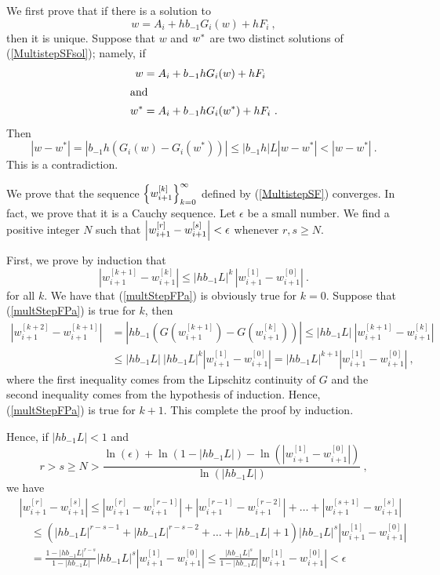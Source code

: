 \begin{rmkList}
\begin{enumerate}
We first prove that if there is a solution to
\begin{equation} \label{MultistepSFsol}
w = A_i + h b_{-1} G_i(w) + h F_i \ ,
\end{equation}
then it is unique.  Suppose that $w$ and $\displaystyle w^\ast$ are two distinct
solutions of (\ref{MultistepSFsol}); namely, if
\begin{align*}
w &= A_i + b_{-1} h G_i(w) + h F_i\\
\intertext{and}
w^\ast &= A_i + b_{-1} h G_i(w^\ast) + h F_i \ .
\end{align*}
Then
\[
|w - w^\ast| = |b_{-1} h (G_i(w) - G_i(w^\ast))|
\leq |b_{-1} h| L |w -w^\ast| < |w - w^\ast| \ .
\]
This is a contradiction.

We prove that the sequence
$\displaystyle \left\{ w_{i+1}^{[k]} \right\}_{k=0}^\infty$
defined by (\ref{MultistepSF}) converges.  In fact, we prove that it
is a Cauchy sequence.  Let $\epsilon$ be a small number.  We find a
positive integer $N$  such that
$\displaystyle \left|w_{i+1}^{[r]} - w_{i+1}^{[s]} \right|< \epsilon$ whenever 
$r,s \geq N$.

First, we prove by induction that
\begin{equation} \label{multStepFPa}
\left| w_{i+1}^{[k+1]} - w_{i+1}^{[k]} \right|
\leq |h b_{-1} L|^k\, \left|w_{i+1}^{[1]} - w_{i+1}^{[0]} \right| \ .
\end{equation}
for all $k$.  We have that (\ref{multStepFPa}) is obviously true for
$k=0$.  Suppose that (\ref{multStepFPa}) is true for $k$, then
\begin{align*}
\left|w_{i+1}^{[k+2]} - w_{i+1}^{[k+1]}\right| &=
\left|h b_{-1} \left( G\left(w_{i+1}^{[k+1]}\right)
- G\left(w_{i+1}^{[k]} \right) \right)\right|
\leq |h b_{-1} L|\ \left| w_{i+1}^{[k+1]} - w_{i+1}^{[k]} \right| \\
&\leq |h b_{-1} L|\ |h b_{-1} L|^k \left|w_{i+1}^{[1]} - w_{i+1}^{[0]} \right|
= |h b_{-1} L|^{k+1} \left| w_{i+1}^{[1]} -w_{i+1}^{[0]} \right| \ ,
\end{align*}
where the first inequality comes from the Lipschitz continuity of $G$
and the second inequality comes from the hypothesis of induction.  Hence,
(\ref{multStepFPa}) is true for $k+1$.  This complete the proof by
induction.

Hence, if $|h b_{-1} L|<1$ and
\[
r > s \geq N >
\frac{\ln(\epsilon) + \ln(1 - |h b_{-1} L|) - 
\ln\left(\left|w_{i+1}^{[1]} - w_{i+1}^{[0]} \right|\right)}
{\ln(|h b_{-1} L|)} \ ,
\]
we have
\begin{align*}
&\left|w_{i+1}^{[r]} - w_{i+1}^{[s]} \right| \leq
\left| w_{i+1}^{[r]} - w_{i+1}^{[r-1]}\right| +
\left| w_{i+1}^{[r-1]} - w_{i+1}^{[r-2]} \right| + \ldots +
\left| w_{i+1}^{[s+1]} - w_{i+1}^{[s]} \right| \\
&\quad \leq \left( |h b_{-1} L|^{r-s-1} + 
|h b_{-1} L|^{r-s-2} + \ldots +
|h b_{-1} L| +  1 \right)
|h b_{-1} L|^s \left|w_{i+1}^{[1]} - w_{i+1}^{[0]} \right| \\
&\quad = \frac{ 1- |h b_{-1} L|^{r-s}}{1-|h b_{-1} L|} 
|h b_{-1} L|^s \left|w_{i+1}^{[1]} - w_{i+1}^{[0]} \right|
\leq \frac{|h b_{-1} L|^s}{1-|h b_{-1} L|}
\left| w_{i+1}^{[1]} - w_{i+1}^{[0]} \right|  < \epsilon
\end{align*}


\end{enumerate}
\end{rmkList}
